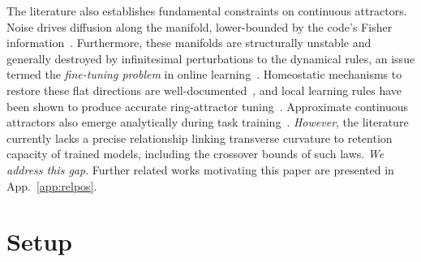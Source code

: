 \documentclass[mlabstract,onecolumn]{jmlr}
\begin{document}
The literature also establishes fundamental constraints on continuous attractors. Noise drives diffusion along the manifold, lower-bounded by the code's Fisher information~\citep{burak_fundamental_2012}. Furthermore, these manifolds are structurally unstable and generally destroyed by infinitesimal perturbations to the dynamical rules, an issue termed the \emph{fine-tuning problem} in online learning~\citep{sagodi_back_2025}. Homeostatic mechanisms to restore these flat directions are well-documented~\citep{renart_robust_2003}, and local learning rules have been shown to produce accurate ring-attractor tuning~\citep{vafidis_learning_2022}. Approximate continuous attractors also emerge analytically during task training~\citep{dinc_ghost_2026}. \emph{However}, the literature currently lacks a precise relationship linking transverse curvature to retention capacity of trained models, including the crossover bounds of such laws. \emph{We address this gap}. Further related works motivating this paper are presented in App.~\ref{app:relpos}.

\section{Setup}\label{sec:setup}
\end{document}
